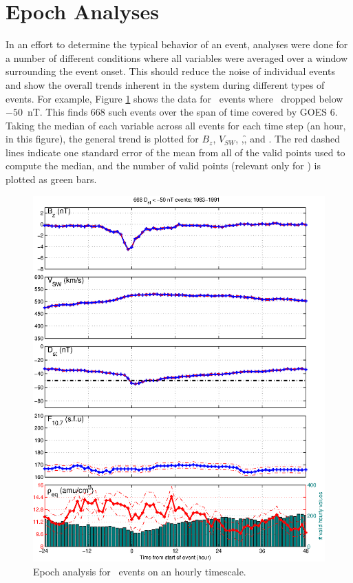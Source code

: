 \section{Epoch Analyses} \label{sec:epochs}
In an effort to determine the typical behavior of an event, analyses were done for a number of different conditions where all variables were averaged over a window surrounding the event onset. This should reduce the noise of individual events and show the overall trends inherent in the system during different types of events. For example, Figure \ref{fig:EpochDst} shows the data for \dst\ events where \dst\ dropped below $-50$~nT. This finds 668 such events over the span of time covered by GOES 6. Taking the median of each variable across all events for each time step (an hour, in this figure), the general trend is plotted for $B_z$, $V_{SW}$, \dst,\f, and \req. The red dashed lines indicate one standard error of the mean from all of the valid points used to compute the median, and the number of valid points (relevant only for \req) is plotted as green bars.

\begin{figure}[htp!]
	\centering
	\includegraphics[width=1\linewidth]{Figures/StormAvs/stormavs-dst}
	\caption{Epoch analysis for \dst\ events on an hourly timescale.}
	\label{fig:EpochDst}
\end{figure}

